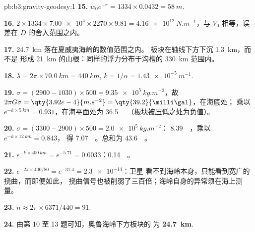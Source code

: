 \begin{solution}{pb:b3:gravity-geodesy:1}
\textbf{15.} $w_0e^{-\pi} = 1334\times0.0432 = \qty{58}{m}$.

\textbf{16.} $2\times1334\times\num{7.00e4}\times2270\times9.81 =
\qty{4.16e12}{N.m^{-1}}$，与 $V_0$ 相等，误差在 $D$ 的舍入范围之内。

\textbf{17.} \qty{24.7}{km} 落在夏威夷海岭的数值范围之内。
板块在轴线下方下沉 \qty{1.3}{km}，而不是
形成 \qty{21}{km} 的山根：同样的浮力分布于沟槽的 \qty{330}{km} 范围内。

\textbf{18.} $\lambda = 2\pi\times\qty{70.0}{km} = \qty{440}{km}$,
$k = 1/\alpha = \qty{1.43e-5}{m^{-1}}$.

\textbf{19.} $\sigma = (2900 - 1030)\times500 = \qty{9.35e5}{kg.m^{-2}}$，故
$2\pi G\sigma = \qty{3.92e-4}{m.s^{-2}} = \qty{39.2}{\milli\gal}$，在海底处；
乘以 $e^{-k\times\qty{5}{km}} = 0.931$，在海平面处为 \qty{36.5}{\milli\gal}
（板块被压低之处为负值）。

\textbf{20.} $\sigma = (3300 - 2900)\times500 = \qty{2.0e5}{kg.m^{-2}}$：
\qty{8.39}{\milli\gal}，乘以 $e^{-k\times\qty{12}{km}} = 0.843$，
得 \qty{7.07}{\milli\gal}。总和为 \qty{43.6}{\milli\gal}。

\textbf{21.} $e^{-k\times\qty{400}{km}} = e^{-5.71} = 0.0033$：\qty{0.14}{\milli\gal}。

\textbf{22.} $e^{-2\pi\times400/80} = e^{-31.4} = \num{2.3e-14}$：卫星
看不到海岭本身，只能看到宽广的挠曲，而即便如此，
挠曲信号也被削弱了三百倍；海岭自身的异常须在海上测量。

\textbf{23.} $n \approx 2\pi\times6371/440 = 91$.

\textbf{24.} 由第 10 至 13 题可知，奥鲁海岭下方板块的
为
\textbf{\qty[text-series-to-math=true]{24.7}{km}}.
\end{solution}
